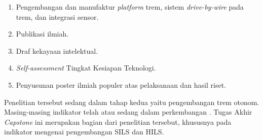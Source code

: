 \begin{enumerate}
    \item Pengembangan dan manufaktur \textit{platform} trem, sistem
    \textit{drive-by-wire} pada trem, dan integrasi sensor.

    \item Publikasi ilmiah.
    \item Draf kekayaan intelektual.
    \item \textit{Self-assessment} Tingkat Kesiapan Teknologi.
    \item Penyusunan poster ilmiah populer atas pelaksanaan dan hasil riset.

\end{enumerate}

Penelitian tersebut sedang dalam tahap kedua yaitu pengembangan trem otonom.
Masing-masing indikator telah atau sedang dalam perkembangan
\parencite{rispro-trilaksono}. Tugas Akhir \textit{Capstone} ini merupakan
bagian dari penelitian tersebut, khususnya pada indikator mengenai pengembangan
SILS dan HILS.


